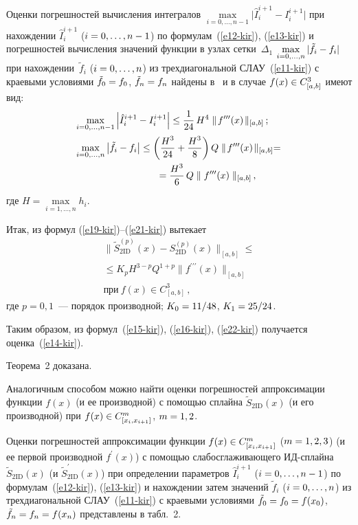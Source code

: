 \begin{multicols}{2}
  Оценки погрешностей вычисления интегралов $\max\limits_{i=0,\ldots ,n-1} 
\vert \hat{I}_i^{i+1}-I_i^{i+1}\vert$ при нахождении $\hat{I}_i^{i+1}$ ($i\hm=0,\ldots , 
n-1$) по формулам~(\ref{e12-kir}), (\ref{e13-kir}) и погрешностей вычисления 
значений функции в узлах сетки~$\Delta_1$ $\max\limits_{i=0,\ldots ,n} \vert 
\tilde{f}_i\hm- f_i\vert$ при нахождении~$\tilde{f}_i$ 
  ($i\hm=0,\ldots ,n$) из трехдиагональной СЛАУ~(\ref{e11-kir}) с краевы\-ми 
условиями $\tilde{f}_0\hm=f_0$, $\tilde{f}_n\hm=f_n$ найдены в~\cite{8-kir} и в 
случае $f(x)\hm\in C^3_{[a,b]}$ имеют вид:
  \begin{align}
 & \max\limits_{i=0,\ldots , n-1}\left\vert \hat{I}_i^{i+1} -I_i^{i+1}\right\vert \leq  
\fr{1}{24}\,H^4 \parallel\! f^{\prime\prime\prime}(x)\!\parallel_{[a,b]}\,; \label{e20-kir}\\ 
 & \max\limits_{i=0,\ldots , n} \left\vert \tilde{f}_i -f_i\right\vert \leq  \left( 
\fr{H^3}{24} + \fr{H^3}{8}\right) Q \parallel \!f^{\prime\prime\prime}(x)\!\parallel_{[a,b]} = {}\notag\\
&\hspace*{30mm}{}=\fr{H^3}{6}\,Q\parallel f^{\prime\prime\prime}(x)\parallel_{[a,b]}\,,
  \label{e21-kir}
  \end{align}
где 
$H=\max\limits_{i=1,\ldots , n} h_i$.
  
  Итак, из формул (\ref{e19-kir})--(\ref{e21-kir}) вытекает
  \begin{multline}
\parallel\! \tilde{S}_{2\mathrm{ID}}^{(p)} (x) -S_{2\mathrm{ID}}^{(p)}(x)\!\parallel_{[a,b]}\leq {}\\
{}\leq K_p 
H^{3-p} Q^{1+p} \parallel\! f^{\prime\prime\prime} (x)\!\parallel_{[a,b]}\\ 
\mbox{при}\ f(x)\in C^3_{[a,b]}\,,
  \label{e22-kir}
  \end{multline}
где $p=0, 1$~--- порядок производной; $K_0\hm= {11}/{48}$, $K_1\hm= 
{25}/{24}$.
  
  Таким образом, из формул~(\ref{e15-kir}), (\ref{e16-kir}), (\ref{e22-kir}) 
получается оценка~(\ref{e14-kir}). 


  
  Теорема~2 доказана.
  
  \medskip
  
  Аналогичным способом можно найти оценки погрешностей аппроксимации 
функции $f(x)$ (и ее производной) с помощью сплайна $\tilde{S}_{2\mathrm{ID}}(x)$ (и 
его производной) при $f(x)\hm\in C^m_{[x_i,x_{i+1}]}$, $m\hm=1,2$.
  
  Оценки погрешностей аппроксимации функции $f(x)\hm \in 
C^m_{[x_i,x_{i+1}]}$ ($m\hm=1,2,3$) (и ее первой производной $f^\prime(x)$) с 
помощью слабо\-сгла\-жи\-ва\-юще\-го ИД-сплай\-на $\tilde{S}_{2\mathrm{ID}}(x)$ (и 
$\tilde{S}^\prime_{2\mathrm{ID}}(x)$) при определении параметров $\hat{I}_i^{i+1}$ 
($i\hm=0, \ldots , n-1$) по формулам~(\ref{e12-kir}), (\ref{e13-kir}) и нахождении 
затем значений $\tilde{f}_i$ ($i\hm=0, \ldots ,n$) из трехдиагональной 
СЛАУ~(\ref{e11-kir}) с краевыми условиями $\tilde{f}_0\hm= f_0\hm= f(x_0)$, 
$\tilde{f}_n \hm= f_n \hm= f(x_n)$ представлены в табл.~2.
  



\end{multicols}
